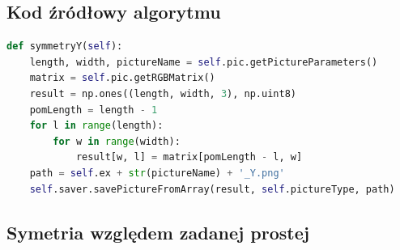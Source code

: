 \documentclass[a4paper,12pt, titlepage]{report}
\begin{document}
\subsection*{Kod źródłowy algorytmu}
\begin{lstlisting}[language=Python]
def symmetryY(self):
    length, width, pictureName = self.pic.getPictureParameters()
    matrix = self.pic.getRGBMatrix()
    result = np.ones((length, width, 3), np.uint8)
    pomLength = length - 1
    for l in range(length):
        for w in range(width):
            result[w, l] = matrix[pomLength - l, w]
    path = self.ex + str(pictureName) + '_Y.png'
    self.saver.savePictureFromArray(result, self.pictureType, path)
\end{lstlisting}

\subsection{Symetria względem zadanej prostej}
\end{document}
